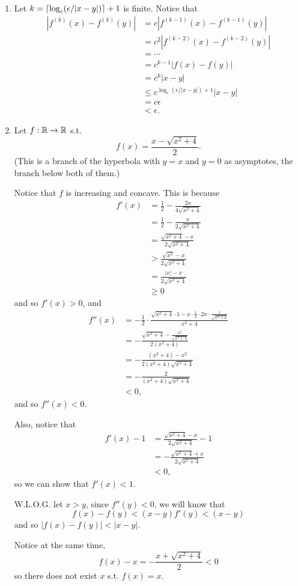 \begin{enumerate}
\item Let \(k = \lceil\log_c(\epsilon/|x-y|)\rceil + 1\) is finite. Notice that 
    \begin{align*}
        |f^{(k)}(x) - f^{(k)}(y)| &= c|f^{(k-1)}(x) - f^{(k-1)}(y)|\\
        &= c^2|f^{(k-2)}(x) - f^{(k-2)}(y)|\\
        &= \cdots\\
        &= c^{k-1}|f(x) - f(y)|\\
        &= c^k |x - y|\\
        &\leq c^{\log_c(\epsilon/|x-y|)+1} |x-y|\\
        &= c\epsilon\\
        &< \epsilon.
    \end{align*}

\item Let \(f: \mathbb{R} \to \mathbb{R}\) s.t.
    \[
        f(x) = \frac{x-\sqrt{x^2+4}}{2}.
    \]
    (This is a branch of the hyperbola with \(y=x\) and \(y=0\) as asymptotes, the branch below both of them.)

    Notice that \(f\) is increasing and concave. This is because
    \begin{align*}
        f'(x) &= \frac{1}{2} - \frac{2x}{4\sqrt{x^2+4}}\\
        &= \frac{1}{2} - \frac{x}{2\sqrt{x^2+4}}\\
        &= \frac{\sqrt{x^2+4}-x}{2\sqrt{x^2+4}}\\
        &> \frac{\sqrt{x^2}-x}{2\sqrt{x^2+4}}\\
        &= \frac{|x|-x}{2\sqrt{x^2+4}}\\
        &\geq 0
    \end{align*}
    and so \(f'(x)>0\), and
    \begin{align*}
        f''(x) &= -\frac{1}{2} \cdot \frac{\sqrt{x^2+4} \cdot 1 - x \cdot \frac{1}{2} \cdot 2x \cdot \frac{1}{\sqrt{x^2+4}}}{x^2+4}\\
        &= -\frac{\sqrt{x^2+4} - \frac{x^2}{\sqrt{x^2+4}}}{2(x^2+4)}\\
        &= -\frac{(x^2+4) - x^2}{2(x^2+4)\sqrt{x^2+4}}\\
        &= -\frac{2}{(x^2+4)\sqrt{x^2+4}}\\
        &< 0,
    \end{align*}
    and so \(f''(x) < 0\).
    
    Also, notice that
    \begin{align*}
        f'(x) - 1 &= \frac{\sqrt{x^2 + 4} -x }{2\sqrt{x^2 + 4}} - 1\\
        &= - \frac{\sqrt{x^2 + 4} +x }{2\sqrt{x^2 + 4}}\\
        &<0,
    \end{align*}
    so we can show that \(f'(x) < 1\).
    
    W.L.O.G. let \(x > y\), since \(f''(y) < 0\), we will know that
    \[
        f(x) - f(y) < (x - y)f'(y) < (x-y)
    \]
    and so \(|f(x) - f(y)| < |x-y|\).
    
    Notice at the same time,
    \[
    f(x) - x = -\frac{x+\sqrt{x^2+4}}{2} < 0
    \]
    so there does not exist \(x\) s.t. \(f(x) = x\).
\end{enumerate}